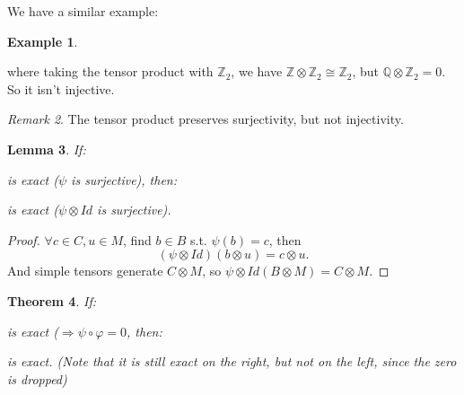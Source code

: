 \documentclass[9pt,reqno,twoside]{amsbook}
\theoremstyle{plain}
\newtheorem{theorem}{Theorem}[chapter]
\numberwithin{section}{chapter}
\numberwithin{equation}{chapter}
\newtheorem{lem}[theorem]{Lemma}
\theoremstyle{definition}
\newtheorem{Ex}[theorem]{Example}
\theoremstyle{remark}
\newtheorem{rem}[theorem]{Remark}
\theoremstyle{plain}
\newcommand{\z}{\mathbb{Z}}
\newcommand{\Q}{\mathbb{Q}}
\newcommand{\tens}{\otimes}
\renewcommand{\phi}{\varphi}
\begin{document}
We have a similar example: 
\begin{Ex}
\begin{center}
\end{center}
where taking the tensor product with $\z_2$, we have $\z \tens \z_2 \cong \z_2$, but $\Q \tens \z_2 = 0$. So it isn't injective. 
\end{Ex}

\begin{rem}
The tensor product preserves surjectivity, but not injectivity. 
\end{rem}
\begin{lem}
If:
\begin{center}
\end{center}
is exact ($\psi$ is surjective), then:
\begin{center}
\end{center}
is exact ($\psi \tens Id$ is surjective).
\end{lem}

\begin{proof}
$\forall c \in C,u \in M$, find $b \in B$ s.t. $\psi(b) = c$,
then 
$$
(\psi \tens Id)(b \tens u) = c \tens u.
$$
 And simple tensors generate $C \tens M$, so $\psi \tens Id(B \tens M) = C \tens M$. 
\end{proof}

\begin{theorem}
If:
\begin{center}
\end{center}
is exact ($\Rightarrow \psi \circ \phi = 0$, then:
\begin{center}
\end{center}
is exact. (Note that it is still exact on the right, but not on the left, since the zero is dropped)
\end{theorem}
\end{document}
